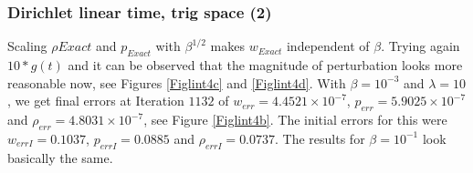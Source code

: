 \documentclass[11pt, a4paper]{article}
\theoremstyle{definition}
\begin{document}
\subsubsection*{Dirichlet linear time, trig space (2)}
Scaling $\rho{Exact}$ and $p_{Exact}$ with $\beta^{1/2}$ makes $w_{Exact}$ independent of $\beta$. Trying again $10*g(t)$ and it can be observed that the magnitude of perturbation looks more reasonable now, see Figures \ref{Figlint4c} and \ref{Figlint4d}.
With $\beta = 10^{-3}$ and $\lambda =10$, we get final errors at Iteration $1132$ of $w_{err} = 4.4521 \times 10^{-7}$, $p_{err} = 5.9025 \times 10^{-7}$ and $\rho_{err} = 4.8031 \times 10^{-7}$, see Figure \ref{Figlint4b}. The initial errors for this were $w_{errI} = 0.1037$, $p_{errI} = 0.0885$ and $\rho_{errI} = 0.0737$. The results for $\beta = 10^{-1}$ look basically the same.
\end{document}
